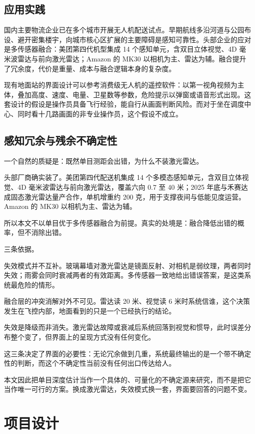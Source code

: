 \documentclass[12pt,a4paper]{ctexart}
\begin{document}
\subsection{应用实践}

国内主要物流企业已在多个城市开展无人机配送试点。早期航线多沿河道与公园布设、避开密集楼宇，向城市核心区扩展的主要障碍是感知可靠性。头部企业的应对是多传感器融合：美团第四代机型集成 14 个感知单元，含双目立体视觉、4D 毫米波雷达与前向激光雷达；Amazon 的 MK30 以相机为主、雷达为辅。融合提升了冗余度，代价是重量、成本与融合逻辑本身的复杂度。

现有地面站的界面设计可以参考消费级无人机的遥控软件：以第一视角视频为主体，叠加高度、速度、电量、卫星数等参数，危险提示以弹窗或语音形式出现。这套设计的假设是操作员具备飞行经验，能自行从画面判断风险。而对于坐在调度中心、同时看十几路画面的非专业操作员，这个假设不成立。

\subsection{感知冗余与残余不确定性}

一个自然的质疑是：既然单目测距会出错，为什么不装激光雷达。

头部厂商确实装了。美团第四代配送机集成 14 个多模态感知单元，含双目立体视觉、4D 毫米波雷达与前向激光雷达，覆盖六向 0.7 至 40 米；2025 年底与禾赛达成固态激光雷达量产合作，单机增重约 200 克，用于支撑夜间与低能见度运营。Amazon 的 MK30 以相机为主、雷达为辅。

所以本文不以单目优于多传感器融合为前提。真实的处境是：融合降低出错的概率，但不消除出错。

三条依据。

失效模式并不互补。玻璃幕墙对激光雷达是镜面反射、对相机是弱纹理，两者同时失效；雨雾会同时衰减两者的有效距离。多传感器一致地给出错误答案，是这类系统最危险的情形。

融合层的冲突消解对外不可见。雷达读 20 米、视觉读 6 米时系统信谁，这个决策发生在飞控内部，地面看到的只是一个已经执行的结论。

失效是降级而非消失。激光雷达故障或衰减后系统回落到视觉和惯导，此时误差分布整个变了，但界面上的呈现方式没有任何变化。

这三条决定了界面的必要性：无论冗余做到几重，系统最终输出的是一个带不确定性的判断，而这个不确定性当前没有任何出口传达给人。

本文因此把单目深度估计当作一个具体的、可量化的不确定源来研究，而不是把它当作唯一可行的方案。换成激光雷达，失效模式换一套，界面要回答的问题不变。

\section{项目设计}
\end{document}
